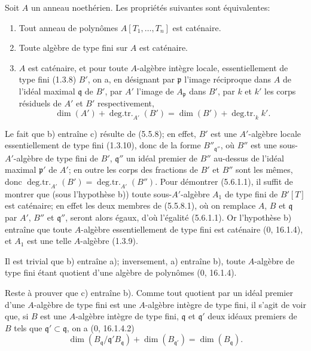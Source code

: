\begin{proposition}[5.6.1]
\label{IV.2.s5.6.1-fr}
Soit $A$ un anneau noethérien. Les propriétés suivantes sont équivalentes:
\begin{enumerate}
\item[a)] Tout anneau de polynômes $A[T_1,\ldots,T_n]$ est caténaire.
\item[b)] Toute algèbre de type fini sur $A$ est caténaire.
\item[c)] $A$ est caténaire, et pour toute $A$-algèbre intègre locale,
essentiellement de type fini (1.3.8) $B'$, on a, en désignant par
$\mathfrak p$ l'image réciproque dans $A$ de l'idéal maximal $\mathfrak q$
de $B'$, par $A'$ l'image de $A_{\mathfrak p}$ dans $B'$, par $k$ et $k'$
les corps résiduels de $A'$ et $B'$ respectivement,
\begin{equation}
\dim(A')+\operatorname{deg.tr.}_{A'}(B')
=\dim(B')+\operatorname{deg.tr.}_k k'.
\tag{5.6.1.1}\label{IV.2.s5.6.1.1-fr}
\end{equation}
\end{enumerate}
\end{proposition}

Le fait que b) entraîne c) résulte de (5.5.8); en effet, $B'$ est une
$A'$-algèbre locale essentiellement de type fini (1.3.10), donc de la forme
$B''_{\mathfrak q''}$, où $B''$ est une sous-$A'$-algèbre de type fini de
$B'$, $\mathfrak q''$ un idéal premier de $B''$ au-dessus de l'idéal maximal
$\mathfrak p'$ de $A'$; en outre les corps des fractions de $B'$ et $B''$
sont les mêmes, donc
$\operatorname{deg.tr.}_{A'}(B')=\operatorname{deg.tr.}_{A'}(B'')$.
Pour démontrer (5.6.1.1), il suffit de montrer que (sous l'hypothèse b)) toute
sous-$A'$-algèbre $A_1$ de type fini de $B'[T]$ est caténaire; en effet les
deux membres de (5.5.8.1), où on remplace $A$, $B$ et $\mathfrak q$ par
$A'$, $B''$ et $\mathfrak q''$, seront alors égaux, d'où l'égalité (5.6.1.1).
Or l'hypothèse b) entraîne que toute $A$-algèbre essentiellement de type fini
est caténaire (0, 16.1.4), et $A_1$ est une telle $A$-algèbre (1.3.9).

Il est trivial que b) entraîne a); inversement, a) entraîne b), toute
$A$-algèbre de type fini étant quotient d'une algèbre de polynômes
(0, 16.1.4).

Reste à prouver que c) entraîne b). Comme tout quotient par un idéal premier
d'une $A$-algèbre de type fini est une $A$-algèbre intègre de type fini, il
s'agit de voir que, si $B$ est une $A$-algèbre intègre de type fini,
$\mathfrak q$ et $\mathfrak q'$ deux idéaux premiers de $B$ tels que
$\mathfrak q'\subset\mathfrak q$, on a (0, 16.1.4.2)
\begin{equation}
\dim(B_{\mathfrak q}/\mathfrak q'B_{\mathfrak q})
+\dim(B_{\mathfrak q'})=\dim(B_{\mathfrak q}).
\tag{5.6.1.2}\label{IV.2.s5.6.1.2-fr}
\end{equation}

